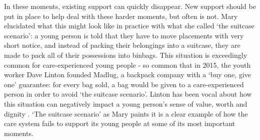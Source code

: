 In these moments, existing support can quickly disappear. New support should be put in place to help deal with these harder moments, but often is not. Mary elucidated what this might look like in practice with what she called `the suitcase scenario': a young person is told that they have to move placements with very short notice, and instead of packing their belongings into a suitcase, they are made to pack all of their  possessions into binbags. This situation is exceedingly common for care-experienced young people - so common that in 2015, the youth worker Dave Linton founded Madlug, a backpack company with a ‘buy one, give one’ guarantee: for every bag sold, a bag would be given to a care-experienced person in order to avoid ‘the suitcase scenario’. Linton has been vocal about how this situation can negatively impact a young person's sense of value, worth and dignity \citep{madlug_madlug_2021}. `The suitcase scenario' as Mary paints it is a clear example of how the care system fails to support its young people at some of its most important moments.

